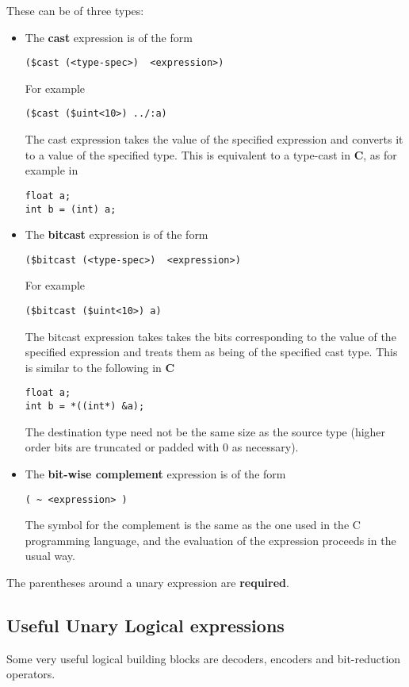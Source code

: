 \documentclass{article}
\begin{document}
These can be of three types:
\begin{itemize}
\item 
The {\bf cast}
expression is of the form
\begin{verbatim}
($cast (<type-spec>)  <expression>)
\end{verbatim} %
For example
\begin{verbatim}
($cast ($uint<10>) ../:a)
\end{verbatim}
The cast expression takes the value of the
specified expression and converts it to a value
of the specified type.  This is equivalent
to a type-cast in {\bf C}, as for example
in
\begin{verbatim}
float a;
int b = (int) a;
\end{verbatim}

\item 
The {\bf bitcast}
expression is of the form
\begin{verbatim}
($bitcast (<type-spec>)  <expression>)
\end{verbatim} %
For example
\begin{verbatim}
($bitcast ($uint<10>) a)
\end{verbatim}
The bitcast expression takes takes the bits
corresponding to the value of the specified expression
and treats them as being of the specified cast type.
This is similar to the following in {\bf C}
\begin{verbatim}
float a;
int b = *((int*) &a);
\end{verbatim}
The destination type need not
be the same size as the source type (higher
order bits are truncated or padded with 0
as necessary).
\item 
The {\bf bit-wise complement} expression is of the form
\begin{verbatim}
( ~ <expression> )
\end{verbatim}
The symbol for the complement is the same
as the one used in the C programming language,
and the evaluation of the expression proceeds in the
usual way.
\end{itemize}

The parentheses around a unary expression are
{\bf required}.

\subsection{Useful Unary Logical expressions}

Some very useful logical building blocks are decoders,
encoders and bit-reduction operators.
\end{document}
